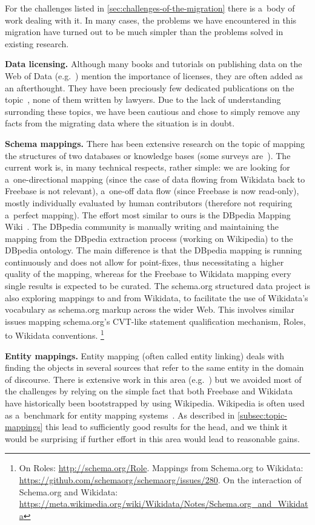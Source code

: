 \documentclass{sig-alternate-2013}
\begin{document}
For the challenges listed in \autoref{sec:challenges-of-the-migration}
there is a~body of work dealing with it. In many cases, the problems we have encountered in
this migration have turned out to be much simpler than the problems solved in existing research.

\textbf{Data licensing.}
Although many books and tutorials on publishing data on the Web of Data
(e.g.~\cite{linkeddatabook,linkeddatabestpractises}) mention the importance of licenses,
they are often added as an afterthought.
They have been preciously few dedicated publications on the
topic~\cite{licenses,licensius}, none of them written by lawyers.
Due to the lack of understanding surronding these topics, we have been
cautious and chose to simply remove any facts from the migrating data
where the situation is in doubt.

\textbf{Schema mappings.}
There has been extensive research on the topic of mapping the structures
of two databases or knowledge bases
(some surveys are~\cite{mappingsurvey1,mappingsurvey2,mappingsurvey3}).
The current work is, in many technical respects, rather simple:
we are looking for a~one-directional mapping (since the case of data
flowing from Wikidata back to Freebase is not relevant),
a~one-off data flow (since Freebase is now read-only),
mostly individually evaluated by human contributors
(therefore not requiring a~perfect mapping).
The effort most similar to ours is the DBpedia Mapping Wiki~\cite{lehmann2014dbpedia}.
The DBpedia community is manually writing and maintaining the mapping from
the DBpedia extraction process (working on Wikipedia) to the DBpedia ontology.
The main difference is that the DBpedia mapping is running continuously
and does not allow for point-fixes, thus necessitating a~higher quality of the mapping,
whereas for the Freebase to Wikidata mapping every single results is expected to be curated.
The schema.org structured data project is also exploring mappings to and from Wikidata,
to facilitate the use of Wikidata's vocabulary as schema.org markup across the wider Web.
This involves similar issues mapping schema.org's CVT-like statement qualification mechanism, Roles,
to Wikidata conventions.%
\footnote{On Roles: \url{http://schema.org/Role}. Mappings from Schema.org to Wikidata:
\url{https://github.com/schemaorg/schemaorg/issues/280}. On the interaction of Schema.org
and Wikidata: \url{https://meta.wikimedia.org/wiki/Wikidata/Notes/Schema.org_and_Wikidata}}

\textbf{Entity mappings.}
Entity mapping (often called entity linking) deals with finding the objects
in several sources that refer to the same entity in the domain of discourse.
There is extensive work in this area (e.g.~\cite{entitylinkingsurvey1,entitylinkingsurvey2})
but we avoided most of the challenges by relying on the simple fact that
both Freebase and Wikidata have historically been bootstrapped by using Wikipedia.
Wikipedia is often used as a~benchmark for entity mapping systems~\cite{entitylinkingwikipedia}.
As described in \autoref{subsec:topic-mappings} this lead to sufficiently good results for the head,
and we think it would be surprising if further effort in this area would lead to reasonable gains.
\end{document}
